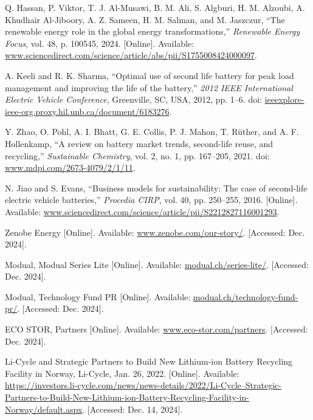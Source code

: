 \documentclass[conference]{IEEEtran}
\begin{document}
\begin{thebibliography}{00}
 Q. Hassan, P. Viktor, T. J. Al-Musawi, B. M. Ali, S. Algburi, H. M. Alzoubi, A. Khudhair Al-Jiboory, A. Z. Sameen, H. M. Salman, and M. Jaszczur, ``The renewable energy role in the global energy transformations,'' \textit{Renewable Energy Focus}, vol. 48, p. 100545, 2024. [Online]. Available: \href{https://www.sciencedirect.com/science/article/abs/pii/S1755008424000097?casa_token=bUNZr0M6nogAAAAA:BW6rOq1yhF3iUOtobThX-tDWVjZDpJL9Hzmk0HS78usaDj24Zq_MftqZLBkgYpIrtdgdilaX}{www.sciencedirect.com/science/article/abs/pii/S1755008424000097}.

 A. Keeli and R. K. Sharma, ``Optimal use of second life battery for peak load management and improving the life of the battery,''  \textit{2012 IEEE International Electric Vehicle Conference}, Greenville, SC, USA, 2012, pp. 1--6. doi: \href{https://ieeexplore-ieee-org.proxy.hil.unb.ca/document/6183276}{ieeexplore-ieee-org.proxy.hil.unb.ca/document/6183276}.


 Y. Zhao, O. Pohl, A. I. Bhatt, G. E. Collis, P. J. Mahon, T. Rüther, and A. F. Hollenkamp, ``A review on battery market trends, second-life reuse, and recycling,'' \textit{Sustainable Chemistry}, vol. 2, no. 1, pp. 167--205, 2021. doi: \href{https://www.mdpi.com/2673-4079/2/1/11}{www.mdpi.com/2673-4079/2/1/11}.

 N. Jiao and S. Evans, ``Business models for sustainability: The case of second-life electric vehicle batteries,'' \textit{Procedia CIRP}, vol. 40, pp. 250--255, 2016. [Online]. Available: \href{https://www.sciencedirect.com/science/article/pii/S2212827116001293}{www.sciencedirect.com/science/article/pii/S2212827116001293}.

 Zenobe Energy [Online]. Available: \href{https://www.zenobe.com/our-story/}{www.zenobe.com/our-story/}. [Accessed: Dec. 2024].

 Modual, Modual Series Lite [Online]. Available: \href{https://modual.ch/series-lite/}{modual.ch/series-lite/}. [Accessed: Dec. 2024].

 Modual, Technology Fund PR [Online]. Available: \href{https://modual.ch/technology-fund-pr/}{modual.ch/technology-fund-pr/}. [Accessed: Dec. 2024].

 ECO STOR, Partners [Online]. Available: \href{https://www.eco-stor.com/partners}{www.eco-stor.com/partners}. [Accessed: Dec. 2024].

 Li-Cycle and Strategic Partners to Build New Lithium-ion Battery Recycling Facility in Norway, Li-Cycle, Jan. 26, 2022. [Online]. Available: \href{https://investors.li-cycle.com/news/news-details/2022/Li-Cycle--Strategic-Partners-to-Build-New-Lithium-ion-Battery-Recycling-Facility-in-Norway/default.aspx}{https://investors.li-cycle.com/news/news-details/2022/Li-Cycle--Strategic-Partners-to-Build-New-Lithium-ion-Battery-Recycling-Facility-in-Norway/default.aspx}. [Accessed: Dec. 14, 2024].


\end{thebibliography}
\end{document}

